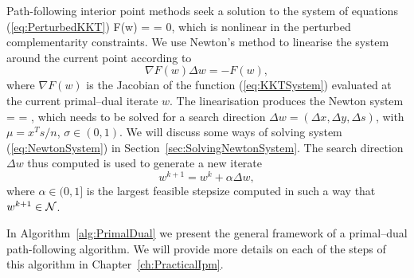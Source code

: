 Path-following interior point methods seek a solution 
to the system of equations (\ref{eq:PerturbedKKT})
\be  \label{eq:KKTSystem}
F(w) =  = 0,
\ee
which is nonlinear in the perturbed complementarity constraints.
We use Newton's method to linearise the system around the 
current point according to
\[
  \nabla F(w) \Delta w = -F(w),
\]
where $\nabla F(w)$ is the Jacobian of the function (\ref{eq:KKTSystem})
evaluated at the current primal--dual iterate $w$.
The linearisation produces the Newton system 
%
\be \label{eq:NewtonSystem}
 =
 =
\left[ \begin{array}{c}
    \xi_b \\ \xi_c \\ \xi_\mu
   \end{array} \right],
\ee
%
which needs to be solved for a search direction
$\Delta w = (\Delta x, \Delta y, \Delta s)$,
with $\mu = x^Ts/n$, $\sigma \in (0,1)$.
We will discuss some ways of solving system (\ref{eq:NewtonSystem})
in Section~\ref{sec:SolvingNewtonSystem}.
The search direction $\Delta w$ thus computed is used to generate 
a new iterate
\[
  w^{k+1} = w^k + \alpha\Delta w,
\]
where $\alpha \in (0,1]$ is the largest feasible stepsize computed in
such a way that
$w^{k+1} \in \mathcal{N}$.

In Algorithm~\ref{alg:PrimalDual} we present the general framework of a 
primal--dual path-following algorithm.
We will provide more details on each of the steps of this algorithm
in Chapter~\ref{ch:PracticalIpm}.

